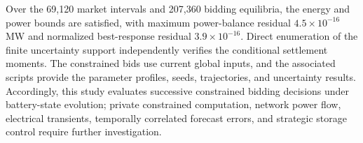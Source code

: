\documentclass[journal]{IEEEtran}
\begin{document}
\begin{table}[t]
\centering
\caption{Synthetic 48-hour performance per operator. Cash gain is the retuned-minus-RN difference with an approximate paired 95\% confidence interval over 30 independent replicates. Export shortfalls are in kWh, ordered RN / fixed ERS / retuned.}
\label{tab:dynamic_results}
\end{table}

Over the 69,120 market intervals and 207,360 bidding equilibria, the energy and power bounds are satisfied, with maximum power-balance residual $4.5\times10^{-16}$\,MW and normalized best-response residual $3.9\times10^{-16}$. Direct enumeration of the finite uncertainty support independently verifies the conditional settlement moments. The constrained bids use current global inputs, and the associated scripts provide the parameter profiles, seeds, trajectories, and uncertainty results. Accordingly, this study evaluates successive constrained bidding decisions under battery-state evolution; private constrained computation, network power flow, electrical transients, temporally correlated forecast errors, and strategic storage control require further investigation.
\end{document}
